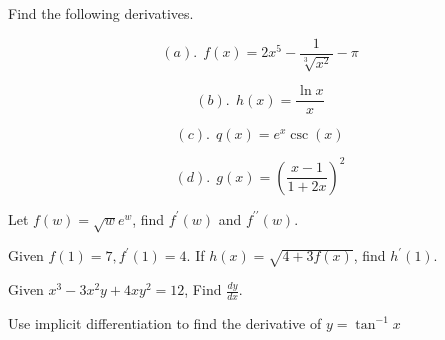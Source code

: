 \documentclass[11pt]{exam}
\begin{document}
\begin{questions}


\addpoints
\question[20] 
Find the following derivatives.  %

\begin{minipage}{.5\linewidth}
\begin{equation*}
(a). \ \ f(x)=2x^{5}-\frac{1}{\sqrt[3]{x^{2}}}-\pi
\end{equation*}
\end{minipage}%
\begin{minipage}{.5\linewidth}
\begin{equation*}
(b). \ \ h(x)=\frac{\ln{x}}{x}
\end{equation*}
\end{minipage}



\vfill

\begin{minipage}{.5\linewidth}
\begin{equation*}
(c). \ \ q(x)=e^{x}\csc{(x)}
\end{equation*}
\end{minipage}%
\begin{minipage}{.5\linewidth}
\begin{equation*}
(d). \ \ g(x)=\left(\frac{x-1}{1+2x}\right)^{2}
\end{equation*}
\end{minipage}
\vfill





\addpoints
\question[8] Let $f(w)=\sqrt{w}e^{w}$, find $f^{\prime}(w)$ and $ f^{\prime\prime}(w)$.  %
\vfill


\addpoints
\question[8] Given $f(1)=7, f^{\prime}(1)=4$. If $h(x)=\sqrt{4+3f(x)}$, find $h^{\prime}(1)$.  %
\vfill


\newpage
\addpoints
\question[10] 
Given $x^{3}-3x^{2}y+4xy^{2}=12$, Find $\frac{dy}{dx}$.
\vfill\vfill


\addpoints
\question[10] 
Use implicit differentiation to find the derivative of $y=\tan^{-1}{x}$
\vfill\vfill




\end{questions}
\end{document}
